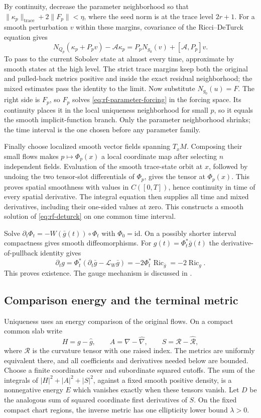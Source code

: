 By continuity, decrease the parameter neighborhood so that
$\|\kappa_p\|_{\mathrm{trace}}+2\|F_p\|<\eta$, where the
seed norm is at the trace level $2r+1$.  For a smooth perturbation
$v$ within these margins, covariance of the Ricci--DeTurck equation gives
\[
 N_{Q_p}(\kappa_p+P_pv)-\mathcal A\kappa_p
   =P_pN_{g_0}(v)+[\mathcal A,P_p]v.
\]
To pass to the current Sobolev state at almost every time, approximate
by smooth states at the high level.  The strict trace margins keep both the original
and pulled-back metrics positive and inside the exact residual
neighborhood; the mixed estimates pass the identity to the limit.
Now substitute $N_{g_0}(u)=F$.  The right side is $F_p$, so
$F_p$ solves \eqref{eq:rf-parameter-forcing} in the forcing space.
Its continuity places it in the local uniqueness neighborhood for
small $p$, so it equals the smooth implicit-function branch.
Only the parameter neighborhood shrinks; the time interval is the
one chosen before any parameter family.

Finally choose localized smooth vector fields spanning $T_xM$.
Composing their small flows makes $p\mapsto\Phi_p(x)$ a local
coordinate map after selecting $n$ independent fields.
Evaluation of the smooth trace-state orbit at $x$, followed by
undoing the two tensor-slot differentials of $\Phi_p$, gives the
tensor at $\Phi_p(x)$.  This proves spatial smoothness with values
in $C([0,T])$, hence continuity in time of every spatial derivative.
The integral equation then supplies all time and mixed derivatives,
including their one-sided values at zero.  This constructs a smooth
solution of \eqref{eq:rf-deturck} on one common time interval.

Solve $\partial_t\Phi_t=-W(\bar g(t))\circ\Phi_t$ with $\Phi_0=\mathrm{id}$.
On a possibly shorter interval compactness gives smooth diffeomorphisms.
For $g(t)=\Phi_t^*\bar g(t)$ the derivative-of-pullback identity gives
\[
 \partial_tg
 =\Phi_t^*(\partial_t\bar g-\mathcal L_W\bar g)
 =-2\Phi_t^*\operatorname{Ric}_{\bar g}=-2\operatorname{Ric}_g.
\]
This proves existence.
The gauge mechanism is discussed in \cite[Theorem 3.11, pp.~39--40]{MT2007}.

\subsection{Comparison energy and the terminal metric}

Uniqueness uses an energy comparison of the original flows.  On a compact
common slab write
\[
 H=g-\widehat g,\qquad A=\nabla-\widehat\nabla,\qquad
 S=\mathcal R-\widehat{\mathcal R},
\]
where $\mathcal R$ is the curvature tensor with one raised index.
The metrics are uniformly equivalent there, and all coefficients and
derivatives needed below are bounded.  Choose a finite coordinate cover
and subordinate squared cutoffs.  The sum of the integrals of
$|H|^2+|A|^2+|S|^2$, against a fixed smooth positive density, is a
nonnegative energy $E$ which vanishes exactly when these tensors vanish.
Let $D$ be the analogous sum of squared coordinate first derivatives
of $S$.  On the fixed compact chart regions, the inverse metric has
one ellipticity lower bound $\lambda>0$.

